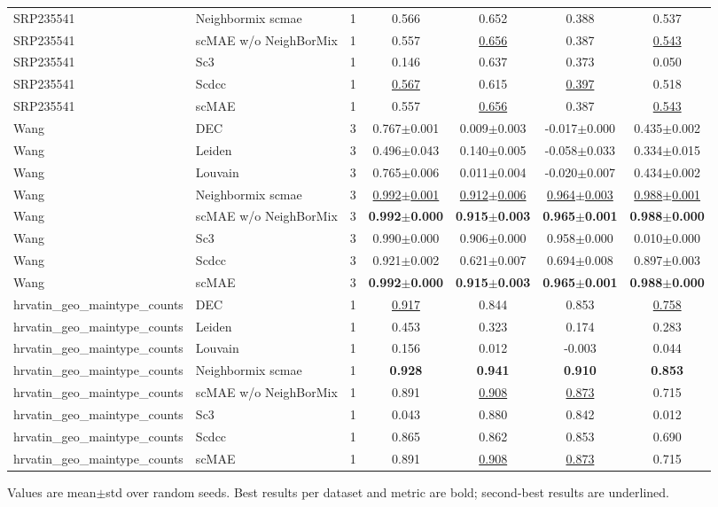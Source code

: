 \begin{table}[t]
\begin{tabular}{llrcccc}
SRP235541 & Neighbormix scmae & 1 & 0.566 & 0.652 & 0.388 & 0.537 \\
SRP235541 & scMAE w/o NeighBorMix & 1 & 0.557 & \underline{0.656} & 0.387 & \underline{0.543} \\
SRP235541 & Sc3 & 1 & 0.146 & 0.637 & 0.373 & 0.050 \\
SRP235541 & Scdcc & 1 & \underline{0.567} & 0.615 & \underline{0.397} & 0.518 \\
SRP235541 & scMAE & 1 & 0.557 & \underline{0.656} & 0.387 & \underline{0.543} \\
\midrule
Wang & DEC & 3 & 0.767$\pm$0.001 & 0.009$\pm$0.003 & -0.017$\pm$0.000 & 0.435$\pm$0.002 \\
Wang & Leiden & 3 & 0.496$\pm$0.043 & 0.140$\pm$0.005 & -0.058$\pm$0.033 & 0.334$\pm$0.015 \\
Wang & Louvain & 3 & 0.765$\pm$0.006 & 0.011$\pm$0.004 & -0.020$\pm$0.007 & 0.434$\pm$0.002 \\
Wang & Neighbormix scmae & 3 & \underline{0.992$\pm$0.001} & \underline{0.912$\pm$0.006} & \underline{0.964$\pm$0.003} & \underline{0.988$\pm$0.001} \\
Wang & scMAE w/o NeighBorMix & 3 & \textbf{0.992$\pm$0.000} & \textbf{0.915$\pm$0.003} & \textbf{0.965$\pm$0.001} & \textbf{0.988$\pm$0.000} \\
Wang & Sc3 & 3 & 0.990$\pm$0.000 & 0.906$\pm$0.000 & 0.958$\pm$0.000 & 0.010$\pm$0.000 \\
Wang & Scdcc & 3 & 0.921$\pm$0.002 & 0.621$\pm$0.007 & 0.694$\pm$0.008 & 0.897$\pm$0.003 \\
Wang & scMAE & 3 & \textbf{0.992$\pm$0.000} & \textbf{0.915$\pm$0.003} & \textbf{0.965$\pm$0.001} & \textbf{0.988$\pm$0.000} \\
\midrule
hrvatin\_geo\_maintype\_counts & DEC & 1 & \underline{0.917} & 0.844 & 0.853 & \underline{0.758} \\
hrvatin\_geo\_maintype\_counts & Leiden & 1 & 0.453 & 0.323 & 0.174 & 0.283 \\
hrvatin\_geo\_maintype\_counts & Louvain & 1 & 0.156 & 0.012 & -0.003 & 0.044 \\
hrvatin\_geo\_maintype\_counts & Neighbormix scmae & 1 & \textbf{0.928} & \textbf{0.941} & \textbf{0.910} & \textbf{0.853} \\
hrvatin\_geo\_maintype\_counts & scMAE w/o NeighBorMix & 1 & 0.891 & \underline{0.908} & \underline{0.873} & 0.715 \\
hrvatin\_geo\_maintype\_counts & Sc3 & 1 & 0.043 & 0.880 & 0.842 & 0.012 \\
hrvatin\_geo\_maintype\_counts & Scdcc & 1 & 0.865 & 0.862 & 0.853 & 0.690 \\
hrvatin\_geo\_maintype\_counts & scMAE & 1 & 0.891 & \underline{0.908} & \underline{0.873} & 0.715 \\
\bottomrule
\end{tabular}
\vspace{2pt}
\footnotesize Values are mean$\pm$std over random seeds. Best results per dataset and metric are bold; second-best results are underlined.
\end{table}
